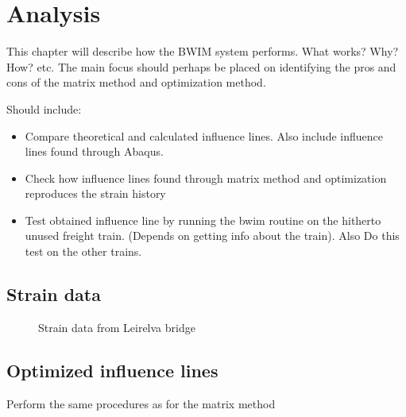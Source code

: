\section{Analysis}

This chapter will describe how the BWIM system performs. What works? Why? How? etc.
The main focus should perhaps be placed on identifying the pros and cons of the matrix method and optimization method.

Should include:
\begin{itemize}
\item Compare theoretical and calculated influence lines. Also include influence lines found through Abaqus.
\item Check how influence lines found through matrix method and optimization reproduces the strain history
\item Test obtained influence line by running the bwim routine on the hitherto unused freight train. (Depends on getting info about the train). Also Do this test on the other trains.
\end{itemize}

\subsection{Strain data}
\begin{figure}[H]
	\centering
	\begin{subfigure}[t]{0.45\textwidth}
		\centering
		
		\label{fig:strain_train3}
	\end{subfigure}
	\qquad
	\begin{subfigure}[t]{0.45\textwidth}
		\centering
		
		\label{fig:strain_train4}
	\end{subfigure}

	\begin{subfigure}[t]{0.45\textwidth}
		\centering
		
		\label{fig:strain_train5}
	\end{subfigure}
	\qquad
	\begin{subfigure}[t]{0.45\textwidth}
		\centering
		
		\label{fig:strain_train8}
	\end{subfigure}
	\caption{Strain data from Leirelva bridge}
	\label{fig:strain_all}
\end{figure}

\subsection{Optimized influence lines}
Perform the same procedures as for the matrix method

